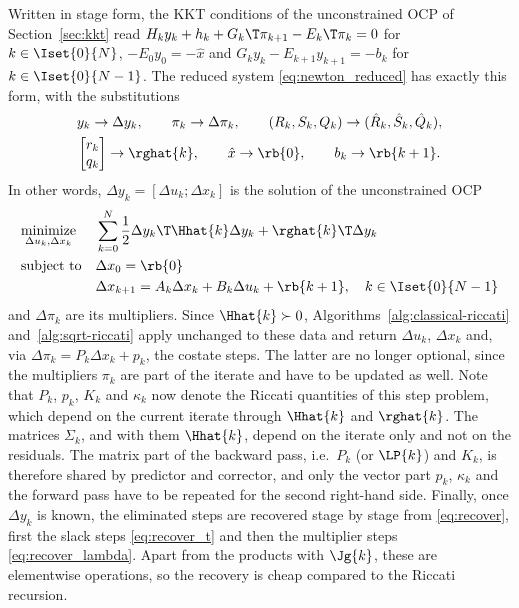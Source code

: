 Written in stage form, the KKT conditions of the unconstrained OCP of Section~\ref{sec:kkt} read $H_k y_k + h_k + G_k\T\pi_{k+1} - E_k\T\pi_k = 0$ for $k\in\Iset{0}{N}$, $-E_0 y_0 = -\hat{x}$ and $G_k y_k - E_{k+1} y_{k+1} = -b_k$ for $k\in\Iset{0}{N-1}$.
The reduced system \eqref{eq:newton_reduced} has exactly this form, with the substitutions
\begin{gather*}
    y_k \to \Delta y_k , \qquad
    \pi_k \to \Delta\pi_k , \qquad
    (R_k, S_k, Q_k) \to (\hat{R}_k, \hat{S}_k, \hat{Q}_k) , \\
    \begin{bmatrix} r_k \\ q_k \end{bmatrix} \to \rghat{k} , \qquad
    \hat{x} \to \rb{0} , \qquad
    b_k \to \rb{k+1} .
\end{gather*}
In other words, $\Delta y_k = [\Delta u_k; \Delta x_k]$ is the solution of the unconstrained OCP
\[
\begin{aligned}
    & \underset{\Delta u_k, \Delta x_k}{\text{minimize}} & & \sum_{k=0}^{N} \frac{1}{2} \Delta y_k\T \Hhat{k} \Delta y_k + \rghat{k}\T \Delta y_k \\
    & \text{subject to} & & \Delta x_0 = \rb{0} \\
    & & & \Delta x_{k+1} = A_k \Delta x_k + B_k \Delta u_k + \rb{k+1}, \quad k \in \Iset{0}{N-1}
\end{aligned}
\]
and $\Delta\pi_k$ are its multipliers.
Since $\Hhat{k} \succ 0$, Algorithms~\ref{alg:classical-riccati} and~\ref{alg:sqrt-riccati} apply unchanged to these data and return $\Delta u_k$, $\Delta x_k$ and, via $\Delta\pi_k = P_k \Delta x_k + p_k$, the costate steps.
The latter are no longer optional, since the multipliers $\pi_k$ are part of the iterate and have to be updated as well.
Note that $P_k$, $p_k$, $K_k$ and $\kappa_k$ now denote the Riccati quantities of this step problem, which depend on the current iterate through $\Hhat{k}$ and $\rghat{k}$.
The matrices $\Sigma_k$, and with them $\Hhat{k}$, depend on the iterate only and not on the residuals.
The matrix part of the backward pass, i.e.\ $P_k$ (or $\LP{k}$) and $K_k$, is therefore shared by predictor and corrector, and only the vector part $p_k$, $\kappa_k$ and the forward pass have to be repeated for the second right-hand side.
Finally, once $\Delta y_k$ is known, the eliminated steps are recovered stage by stage from \eqref{eq:recover}, first the slack steps \eqref{eq:recover_t} and then the multiplier steps \eqref{eq:recover_lambda}.
Apart from the products with $\Jg{k}$, these are elementwise operations, so the recovery is cheap compared to the Riccati recursion.

